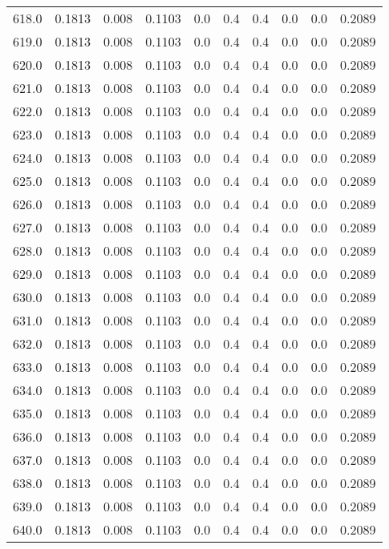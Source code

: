 \begin{longtable}{lrrrrrrrrr}
618.0 & 0.1813 & 0.008 & 0.1103 & 0.0 & 0.4 & 0.4 & 0.0 & 0.0 & 0.2089 \\
619.0 & 0.1813 & 0.008 & 0.1103 & 0.0 & 0.4 & 0.4 & 0.0 & 0.0 & 0.2089 \\
620.0 & 0.1813 & 0.008 & 0.1103 & 0.0 & 0.4 & 0.4 & 0.0 & 0.0 & 0.2089 \\
621.0 & 0.1813 & 0.008 & 0.1103 & 0.0 & 0.4 & 0.4 & 0.0 & 0.0 & 0.2089 \\
622.0 & 0.1813 & 0.008 & 0.1103 & 0.0 & 0.4 & 0.4 & 0.0 & 0.0 & 0.2089 \\
623.0 & 0.1813 & 0.008 & 0.1103 & 0.0 & 0.4 & 0.4 & 0.0 & 0.0 & 0.2089 \\
624.0 & 0.1813 & 0.008 & 0.1103 & 0.0 & 0.4 & 0.4 & 0.0 & 0.0 & 0.2089 \\
625.0 & 0.1813 & 0.008 & 0.1103 & 0.0 & 0.4 & 0.4 & 0.0 & 0.0 & 0.2089 \\
626.0 & 0.1813 & 0.008 & 0.1103 & 0.0 & 0.4 & 0.4 & 0.0 & 0.0 & 0.2089 \\
627.0 & 0.1813 & 0.008 & 0.1103 & 0.0 & 0.4 & 0.4 & 0.0 & 0.0 & 0.2089 \\
628.0 & 0.1813 & 0.008 & 0.1103 & 0.0 & 0.4 & 0.4 & 0.0 & 0.0 & 0.2089 \\
629.0 & 0.1813 & 0.008 & 0.1103 & 0.0 & 0.4 & 0.4 & 0.0 & 0.0 & 0.2089 \\
630.0 & 0.1813 & 0.008 & 0.1103 & 0.0 & 0.4 & 0.4 & 0.0 & 0.0 & 0.2089 \\
631.0 & 0.1813 & 0.008 & 0.1103 & 0.0 & 0.4 & 0.4 & 0.0 & 0.0 & 0.2089 \\
632.0 & 0.1813 & 0.008 & 0.1103 & 0.0 & 0.4 & 0.4 & 0.0 & 0.0 & 0.2089 \\
633.0 & 0.1813 & 0.008 & 0.1103 & 0.0 & 0.4 & 0.4 & 0.0 & 0.0 & 0.2089 \\
634.0 & 0.1813 & 0.008 & 0.1103 & 0.0 & 0.4 & 0.4 & 0.0 & 0.0 & 0.2089 \\
635.0 & 0.1813 & 0.008 & 0.1103 & 0.0 & 0.4 & 0.4 & 0.0 & 0.0 & 0.2089 \\
636.0 & 0.1813 & 0.008 & 0.1103 & 0.0 & 0.4 & 0.4 & 0.0 & 0.0 & 0.2089 \\
637.0 & 0.1813 & 0.008 & 0.1103 & 0.0 & 0.4 & 0.4 & 0.0 & 0.0 & 0.2089 \\
638.0 & 0.1813 & 0.008 & 0.1103 & 0.0 & 0.4 & 0.4 & 0.0 & 0.0 & 0.2089 \\
639.0 & 0.1813 & 0.008 & 0.1103 & 0.0 & 0.4 & 0.4 & 0.0 & 0.0 & 0.2089 \\
640.0 & 0.1813 & 0.008 & 0.1103 & 0.0 & 0.4 & 0.4 & 0.0 & 0.0 & 0.2089 \\

\end{longtable}

